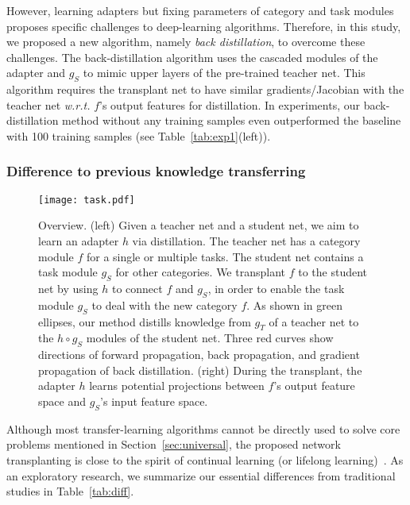 \documentclass[10pt,twocolumn,letterpaper]{article}
\begin{document}
However, learning adapters but fixing parameters of category and task modules proposes specific challenges to deep-learning algorithms. Therefore, in this study, we proposed a new algorithm, namely \textit{back distillation}, to overcome these challenges. The back-distillation algorithm uses the cascaded modules of the adapter and $g_{S}$ to mimic upper layers of the pre-trained teacher net. This algorithm requires the transplant net to have similar gradients/Jacobian with the teacher net \emph{w.r.t.} $f$'s output features for distillation. In experiments, our back-distillation method without any training samples even outperformed the baseline with 100 training samples (see Table~\ref{tab:exp1}(left)).


\subsubsection{Difference to previous knowledge transferring}


\begin{figure*}[t]
\centering
\texttt{[image: task.pdf]}
\caption{Overview. (left) Given a teacher net and a student net, we aim to learn an adapter $h$ via distillation. The teacher net has a category module $f$ for a single or multiple tasks. The student net contains a task module {\small$g_{S}$} for other categories. We transplant $f$ to the student net by using $h$ to connect $f$ and {\small$g_{S}$}, in order to enable the task module {\small$g_{S}$} to deal with the new category $f$. As shown in green ellipses, our method distills knowledge from {\small$g_{T}$} of a teacher net to the {\small$h \circ g_{S}$} modules of the student net. Three red curves show directions of forward propagation, back propagation, and gradient propagation of back distillation. (right) During the transplant, the adapter $h$ learns potential projections between $f$'s output feature space and {\small$g_{S}$}'s input feature space.}
\label{fig:task}
\end{figure*}

Although most transfer-learning algorithms cannot be directly used to solve core problems mentioned in Section~\ref{sec:universal}, the proposed network transplanting is close to the spirit of continual learning (or lifelong learning)~\cite{ProgressiveNN,PathNet,continualLearning,LifelongLearning,metaContinual}. As an exploratory research, we summarize our essential differences from traditional studies in Table~\ref{tab:diff}.
\end{document}
